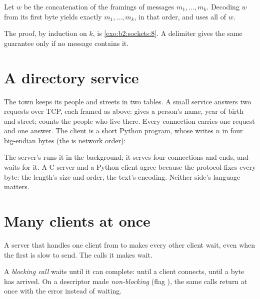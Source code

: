 \begin{proposition}\label{prop:b2:sockets:prefix-free}
Let $w$ be the concatenation of the framings of messages $m_1, \dots, m_k$. Decoding $w$ from its first byte yields
exactly $m_1, \dots, m_k$, in that order, and uses all of $w$.
\end{proposition}

The proof, by induction on $k$, is \cref{exo:b2:sockets:8}. A delimiter gives the same guarantee only if no message
contains it.

\section{A directory service}\label{sec:b2:sockets:directory}

The town keeps its people and streets in two tables. A small service answers two requests over TCP, each framed as
above:  gives a person's name, year of birth and street;  counts the people who
live there. Every connection carries one request and one answer. The client is a short Python program, whose
 writes $n$ in four big-endian bytes (the \code{!} is network order):


\label{out:b2:sockets:directory}

The server's \code{&} runs it in the background; it serves four connections and ends, and  waits for it. A
C server and a Python client agree because the protocol fixes every byte: the length's size and order, the text's
encoding. Neither side's language matters.

\section{Many clients at once}\label{sec:b2:sockets:concurrency}

A server that handles one client from  to  makes every other client wait, even when the
first is slow to send. The calls it makes wait.

\begin{definition}\label{def:b2:sockets:blocking}
A \emph{blocking call} waits until it can complete:  until a client connects,
 until a byte has arrived. On a descriptor made \emph{non-blocking} (flag
), the same calls return at once with the error  instead of waiting.
\end{definition}

